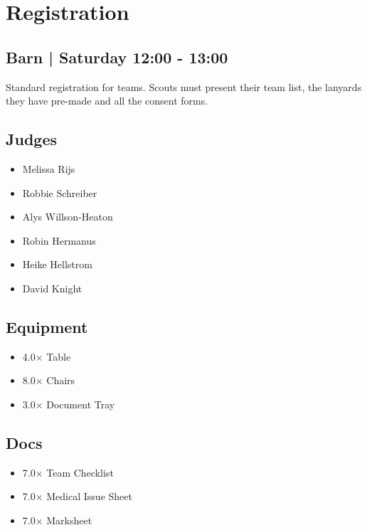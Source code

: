 \documentclass[10pt]{article}
\begin{document}
		\begin{minipage}{\linewidth}
		\setcounter{section}{1}
	\section{Registration }
	\subsection*{Barn | Saturday 12:00 - 13:00}

	Standard registration for teams. Scouts must present their team list, the lanyards they have pre-made and all the consent forms. 

	\begin{multicols}{2}
	\subsection*{\faUsers \: Judges}
	\begin{itemize}
			\item Melissa Rijs
			\item Robbie Schreiber
			\item Alys Willson-Heaton
			\item Robin Hermanus
			\item Heike Hellstrom
			\item David Knight
		\end{itemize}
	\columnbreak
	\subsection*{\faWrench \: Equipment}
	
        \begin{itemize}
                    \item 4.0$\times$ \: Table
                    \item 8.0$\times$ \: Chairs
                    \item 3.0$\times$ \: Document Tray
                \end{itemize}
                \vfill\null
        \subsection*{\faFile \: Docs}
     
        \begin{itemize}
                    \item 7.0$\times$ \: Team Checklist
                    \item 7.0$\times$ \: Medical Issue Sheet
                    \item 7.0$\times$ \: Marksheet
                \end{itemize}
        	\end{multicols}


	\vspace{1cm}
	\end{minipage}
\end{document}
